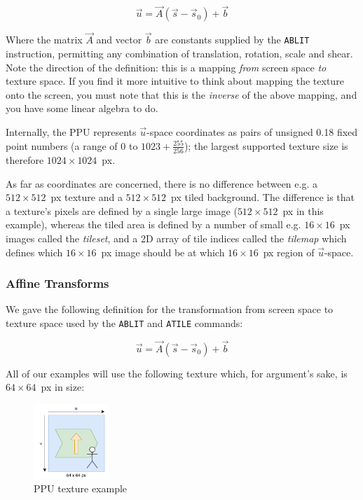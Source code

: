 \[
\vec{u} = \vec{A}(\vec{s} - \vec{s}_0) + \vec{b}
\]

Where the matrix $\vec{A}$ and vector $\vec{b}$ are constants supplied by the {\tt ABLIT} instruction, permitting any combination of translation, rotation, scale and shear. Note the direction of the definition: this is a mapping {\it from} screen space {\it to} texture space. If you find it more intuitive to think about mapping the texture onto the screen, you must note that this is the {\it inverse} of the above mapping, and you have some linear algebra to do.

Internally, the PPU represents $\vec{u}$-space coordinates as pairs of unsigned 0.18 fixed point numbers (a range of $0$ to $1023 + \frac{255}{256}$); the largest supported texture size is therefore $1024 \times 1024$~px.

As far as coordinates are concerned, there is no difference between e.g. a $512\times 512$~px texture and a $512\times 512$~px tiled background. The difference is that a texture's pixels are defined by a single large image ($512 \times 512$~px in this example), whereas the tiled area is defined by a number of small e.g. $16 \times 16$~px images called the {\it tileset}, and a 2D array of tile indices called the {\it tilemap} which defines which $16 \times 16$~px image should be at which $16 \times 16$~px region of $\vec{u}$-space.

\subsubsection*{Affine Transforms}
\label{section:affine_transform}

We gave the following definition for the transformation from screen space to texture space used by the {\tt ABLIT} and {\tt ATILE} commands:

\[
\vec{u} = \vec{A}(\vec{s} - \vec{s}_0) + \vec{b}
\]

All of our examples will use the following texture which, for argument's sake, is $64 \times 64$~px in size:

\begin{figure}[H]
\centering
\caption{PPU texture example}
\label{diagram:ppu_texture_example}
\includegraphics[width=0.25\textwidth]{diagrams/ppu_texture_example.pdf}
\end{figure}


